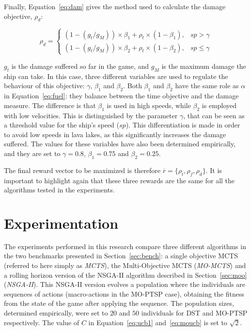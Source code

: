 \documentclass[journal]{IEEEtran}
\begin{document}
Finally, Equation~\ref{eq:dam} gives the method used to calculate the damage objective, $\rho_d$:


\begin{equation}	\label{eq:dam}
\rho_d = 
\begin{cases}
	(1 - (g_t/g_M)) \times \beta_{1} + \rho_t \times (1 - \beta_{1}), & sp > \gamma\\
	(1 - (g_t/g_M)) \times \beta_{2} + \rho_t \times (1 - \beta_{2}), & sp \leq \gamma
\end{cases}
\end{equation}

$g_t$ is the damage suffered so far in the game, and $g_M$ is the maximum damage the ship can take. In this case, three different variables are used to regulate the behaviour of this objective: $\gamma$, $\beta_{1}$ and $\beta_{2}$. Both $\beta_{1}$ and $\beta_{2}$ have the same role as $\alpha$ in Equation~\ref{eq:fuel}: they balance between the time objective and the damage measure. The difference is that $\beta_{1}$ is used in high speeds, while $\beta_{2}$ is employed with low velocities. This is distinguished by the parameter $\gamma$, that can be seen as a threshold value for the ship's speed ($sp$). This differentiation is made in order to avoid low speeds in lava lakes, as this significantly increases the damage suffered. The values for these variables have also been determined empirically, and they are set to $\gamma = 0.8$, $\beta_{1} = 0.75$ and $\beta_{2} = 0.25$.

The final reward vector to be maximized is therefore $\overline{r} = \{ \rho_t, \rho_f, \rho_d \}$. It is important to highlight again that these three rewards are the same for all the algorithms tested in the experiments. 

\section{Experimentation} \label{sec:exp}

The experiments performed in this research compare three different algorithms in the two benchmarks presented in Section~\ref{sec:bench}: a single objective MCTS (referred to here simply as \textit{MCTS}), the Multi-Objective MCTS (\textit{MO-MCTS}) and a rolling horizon version of the NSGA-II algorithm described in Section~\ref{sec:moo} (\textit{NSGA-II}). This NSGA-II version evolves a population where the individuals are sequences of actions (macro-actions in the MO-PTSP case), obtaining the fitness from the state of the game after applying the sequence. The population sizes, determined empirically, were set to $20$ and $50$ individuals for DST and MO-PTSP respectively. The value of $C$ in Equation~\ref{eq:ucb1} and~\ref{eq:moucb} is set to $\sqrt{2}$.
\end{document}
